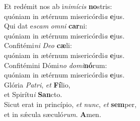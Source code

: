 \evenverse Et redémit nos ab i\textit{ni}\textit{mí}\textit{cis} \textbf{no}stris:~\*\\
\evenverse quóniam in ætérnum misericórdi\textit{a} \textbf{e}jus.\\
\oddverse Qui dat e\textit{scam} \textit{om}\textit{ni} \textbf{car}ni:~\*\\
\oddverse quóniam in ætérnum misericórdi\textit{a} \textbf{e}jus.\\
\evenverse Confitémi\textit{ni} \textit{De}\textit{o} \textbf{cæ}li:~\*\\
\evenverse quóniam in ætérnum misericórdi\textit{a} \textbf{e}jus.\\
\oddverse Confitémini Dómi\textit{no} \textit{do}\textit{mi}\textbf{nó}rum:~\*\\
\oddverse quóniam in ætérnum misericórdi\textit{a} \textbf{e}jus.\\
\evenverse Glória \textit{Pa}\textit{tri}, \textit{et} \textbf{Fí}lio,~\*\\
\evenverse et Spirítu\textit{i} \textbf{San}cto.\\
\oddverse Sicut erat in princípio, \textit{et} \textit{nunc}, \textit{et} \textbf{sem}per,~\*\\
\oddverse et in sǽcula sæculó\textit{rum}. \textbf{A}men.\\
